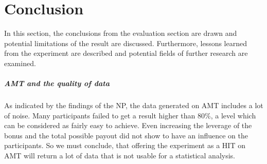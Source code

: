 
\chapter{Conclusion}
\label{ch:Conclusion}

In this section, the conclusions from the evaluation section are drawn and potential limitations of the result are discussed. Furthermore, lessons learned from the experiment are described and potential fields of further research are examined.

\paragraph{\acf{AMT} and the quality of data}
As indicated by the findings of the \acl{NP}, the data generated on \ac{AMT} includes a lot of noise. Many participants failed to get a result higher than 80\%, a level which can be considered as fairly easy to achieve. Even increasing the leverage of the bonus and the total possible payout did not show to have an influence on the participants. So we must conclude, that offering the experiment as a \ac{HIT} on \ac{AMT} will return a lot of data that is not usable for a statistical analysis. 

